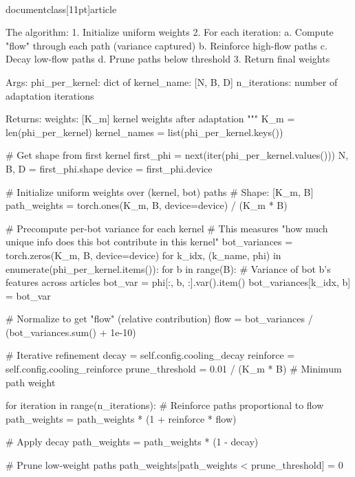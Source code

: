 \\documentclass[11pt]{article}
\begin{document}
\begin{CodeBlock}
{{{{{{{{        The algorithm:
        1. Initialize uniform weights
        2. For each iteration:
           a. Compute "flow" through each path (variance captured)
           b. Reinforce high-flow paths
           c. Decay low-flow paths
           d. Prune paths below threshold
        3. Return final weights
        
        Args:
            phi_per_kernel: dict of {kernel_name: [N, B, D]}
            n_iterations: number of adaptation iterations
            
        Returns:
            weights: [K_m] kernel weights after adaptation
        """
        K_m = len(phi_per_kernel)
        kernel_names = list(phi_per_kernel.keys())
        
        # Get shape from first kernel
        first_phi = next(iter(phi_per_kernel.values()))
        N, B, D = first_phi.shape
        device = first_phi.device
        
        # Initialize uniform weights over (kernel, bot) paths
        # Shape: [K_m, B]
        path_weights = torch.ones(K_m, B, device=device) / (K_m * B)
        
        # Precompute per-bot variance for each kernel
        # This measures "how much unique info does this bot contribute in this kernel"
        bot_variances = torch.zeros(K_m, B, device=device)
        for k_idx, (k_name, phi) in enumerate(phi_per_kernel.items()):
            for b in range(B):
                # Variance of bot b's features across articles
                bot_var = phi[:, b, :].var().item()
                bot_variances[k_idx, b] = bot_var
        
        # Normalize to get "flow" (relative contribution)
        flow = bot_variances / (bot_variances.sum() + 1e-10)
        
        # Iterative refinement
        decay = self.config.cooling_decay
        reinforce = self.config.cooling_reinforce
        prune_threshold = 0.01 / (K_m * B)  # Minimum path weight
        
        for iteration in range(n_iterations):
            # Reinforce paths proportional to flow
            path_weights = path_weights * (1 + reinforce * flow)
            
            # Apply decay
            path_weights = path_weights * (1 - decay)
            
            # Prune low-weight paths
            path_weights[path_weights < prune_threshold] = 0
            
}}}}}}}}
\end{CodeBlock}
\end{document}
